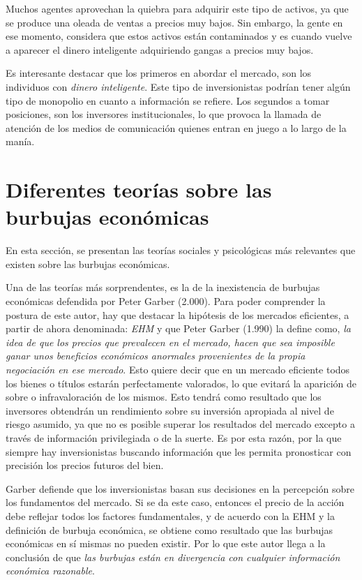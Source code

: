 \begin{enumerate}
	Muchos agentes aprovechan la quiebra para adquirir este tipo de activos, ya que se produce una oleada de ventas a precios muy bajos. Sin embargo, la gente en ese momento, considera que estos activos están contaminados y es cuando vuelve a aparecer el dinero inteligente adquiriendo gangas a precios muy bajos.
\end{enumerate}

Es interesante destacar que los primeros en abordar el mercado, son los individuos con \emph{dinero inteligente}. Este tipo de inversionistas podrían tener algún tipo de monopolio en cuanto a información se refiere. Los segundos a tomar posiciones, son los inversores institucionales, lo que provoca la llamada de atención de los medios de comunicación quienes entran en juego a lo largo de la manía. 

\section{Diferentes teorías sobre las burbujas económicas}
En esta sección, se presentan las teorías sociales y psicológicas más relevantes que existen sobre las burbujas económicas.

Una de las teorías más sorprendentes, es la de la inexistencia de burbujas económicas defendida por Peter Garber (2.000). Para poder comprender la postura de este autor, hay que destacar la hipótesis de los mercados eficientes, a partir de ahora denominada: \emph{EHM} y que Peter Garber (1.990) la define como, \emph{la idea de que los precios que prevalecen en el mercado, hacen que sea imposible ganar unos beneficios económicos anormales provenientes de la propia negociación en ese mercado}. Esto quiere decir que en un mercado eficiente todos los bienes o títulos estarán perfectamente valorados, lo que evitará la aparición de sobre o infravaloración de los mismos. Esto tendrá como resultado que los inversores obtendrán un rendimiento sobre su inversión apropiada al nivel de riesgo asumido, ya que no es posible superar los resultados del mercado excepto a través de información privilegiada o de la suerte. Es por esta razón, por la que siempre hay inversionistas buscando información que les permita pronosticar con precisión los precios futuros del bien.


Garber defiende que los inversionistas basan sus decisiones en la percepción sobre los fundamentos del mercado. Si se da este caso, entonces el precio de la acción debe reflejar todos los factores fundamentales, y de acuerdo con la EHM y la definición de burbuja económica, se obtiene como resultado que las burbujas económicas en sí mismas no pueden existir. Por lo que este autor llega a la conclusión de que \emph{las burbujas están en divergencia con cualquier información económica razonable}.

